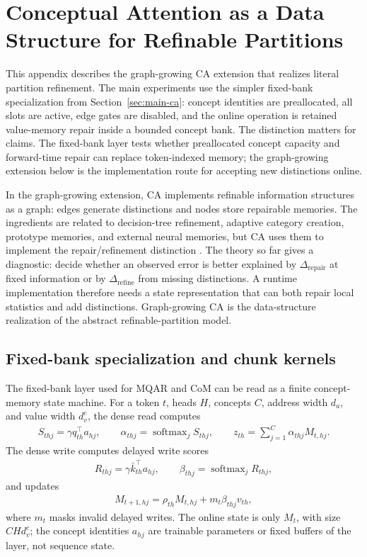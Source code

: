 \section{Conceptual Attention as a Data Structure for Refinable Partitions}
\label{sec:algorithms}

This appendix describes the graph-growing CA extension that realizes literal partition refinement. The main experiments use the simpler fixed-bank specialization from Section~\ref{sec:main-ca}: concept identities are preallocated, all slots are active, edge gates are disabled, and the online operation is retained value-memory repair inside a bounded concept bank. The distinction matters for claims. The fixed-bank layer tests whether preallocated concept capacity and forward-time repair can replace token-indexed memory; the graph-growing extension below is the implementation route for accepting new distinctions online.

In the graph-growing extension, CA implements refinable information structures as a graph: edges generate distinctions and nodes store repairable memories. The ingredients are related to decision-tree refinement, adaptive category creation, prototype memories, and external neural memories, but CA uses them to implement the repair/refinement distinction \citep{breiman1984classification,domingos2000mining,carpenter1987massively,grossberg2013adaptive,kohonen1990self,weston2015memory,graves2016hybrid}. The theory so far gives a diagnostic: decide whether an observed error is better explained by $\Delta_{\mathrm{repair}}$ at fixed information or by $\Delta_{\mathrm{refine}}$ from missing distinctions. A runtime implementation therefore needs a state representation that can both repair local statistics and add distinctions. Graph-growing CA is the data-structure realization of the abstract refinable-partition model.

\subsection{Fixed-bank specialization and chunk kernels}
\label{sec:fixed-bank-kernel}

The fixed-bank layer used for MQAR and CoM can be read as a finite concept-memory state machine. For a token $t$, heads $H$, concepts $C$, address width $d_a$, and value width $d_v^c$, the dense read computes
\begin{align*}
S_{thj}=\gamma q_{th}^{\top}a_{hj},
\qquad
\alpha_{thj}=\operatorname{softmax}_j S_{thj},
\qquad
z_{th}=\sum_{j=1}^{C}\alpha_{thj}M_{t,hj}.
\end{align*}
The dense write computes delayed write scores
\begin{align*}
R_{thj}=\gamma \bar k_{th}^{\top}a_{hj},
\qquad
\beta_{thj}=\operatorname{softmax}_j R_{thj},
\end{align*}
and updates
\begin{align*}
M_{t+1,hj}
=
\rho_{th}M_{t,hj}
+m_t\beta_{thj}v_{th},
\end{align*}
where $m_t$ masks invalid delayed writes. The online state is only $M_t$, with size $C H d_v^c$; the concept identities $a_{hj}$ are trainable parameters or fixed buffers of the layer, not sequence state.

